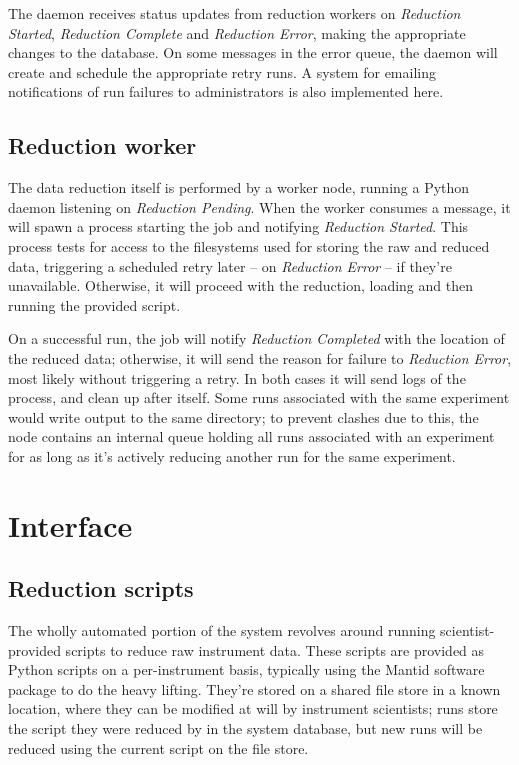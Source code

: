 \documentclass[twocolumn]{article}
\begin{document}
The daemon receives status updates from reduction workers on
\emph{Reduction Started}, \emph{Reduction Complete} and \emph{Reduction
Error}, making the appropriate changes to the database. On some messages
in the error queue, the daemon will create and schedule the appropriate
retry runs. A system for emailing notifications of run failures to
administrators is also implemented here.

\subsection{Reduction worker}\label{reduction-worker}

The data reduction itself is performed by a worker node, running a
Python daemon listening on \emph{Reduction Pending}. When the worker
consumes a message, it will spawn a process starting the job and
notifying \emph{Reduction Started}. This process tests for access to the
filesystems used for storing the raw and reduced data, triggering a
scheduled retry later -- on \emph{Reduction Error} -- if they're
unavailable. Otherwise, it will proceed with the reduction, loading and
then running the provided script.

On a successful run, the job will notify \emph{Reduction Completed} with
the location of the reduced data; otherwise, it will send the reason for
failure to \emph{Reduction Error}, most likely without triggering a
retry. In both cases it will send logs of the process, and clean up
after itself. Some runs associated with the same experiment would write
output to the same directory; to prevent clashes due to this, the node
contains an internal queue holding all runs associated with an
experiment for as long as it's actively reducing another run for the
same experiment.

\section{Interface}\label{interface}

\subsection{Reduction scripts}\label{reduction-scripts}

The wholly automated portion of the system revolves around running
scientist-provided scripts to reduce raw instrument data. These scripts
are provided as Python scripts on a per-instrument basis, typically
using the Mantid software package to do the heavy lifting. They're
stored on a shared file store in a known location, where they can be
modified at will by instrument scientists; runs store the script they
were reduced by in the system database, but new runs will be reduced
using the current script on the file store.
\end{document}
